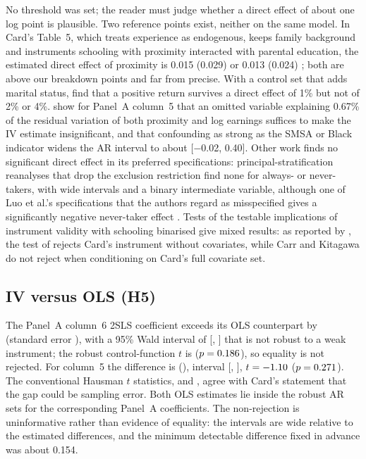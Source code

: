 \documentclass[11pt]{article}
\begin{document}
No threshold was set; the reader must judge whether a direct effect of about one log point
is plausible. Two reference points exist, neither on the same model. In Card's Table~5,
which treats experience as endogenous, keeps family background and instruments schooling
with proximity interacted with parental education, the estimated direct effect of
proximity is 0.015 (0.029) or 0.013 (0.024) \citep{card1993nber}; both are above our %
breakdown points and far from precise. With a control set that adds marital status,
\citet{steiner2025possibilistic} find that a positive return survives a direct effect of 1\%
but not of 2\% or 4\%. \citet{cinelli2025omitted} show for Panel~A column~5 that an omitted
variable explaining 0.67\% of the residual variation of both proximity and log earnings %
suffices to make the IV estimate insignificant, and that confounding as strong as the SMSA
or Black indicator widens the AR interval to about [$-$0.02, 0.40]. Other work finds no significant %
direct effect in its preferred specifications: principal-stratification reanalyses that
drop the exclusion restriction find none for always- or never-takers, with wide intervals
and a binary intermediate variable, although one of Luo et al.'s specifications that the
authors regard as misspecified gives a significantly negative never-taker effect
\citep{jiang2022multiply,luo2024identification}. Tests of the testable implications of
instrument validity with schooling binarised give mixed results: as reported by
\citet{carr2021testing}, the test of \citet{kitagawa2015test} rejects Card's instrument
without covariates, while Carr and Kitagawa do not reject when conditioning on Card's full
covariate set.

\subsection{IV versus OLS (H5)}
\label{sec:h5}

The Panel~A column~6 2SLS coefficient exceeds its OLS counterpart by \ASixPacoefDiff{}
(standard error \ASixPacoefDiffSe{}), with a 95\% Wald interval of [\ASixPacoefDiffLo,
\ASixPacoefDiffHi] that is not robust to a weak instrument; the robust control-function
$t$ is \ASixPacoefCfT{} ($p = 0.186$), so equality is not rejected. For column~5 the
difference is \AFivePacoefDiff{} (\AFivePacoefDiffSe{}), interval [\AFivePacoefDiffLo,
\AFivePacoefDiffHi], $t = -1.10$ ($p = 0.271$). The conventional Hausman
$t$ statistics, \ASixPacoefHausmanTConv{} and \AFivePacoefHausmanTConv{}, agree with Card's
statement that the gap could be sampling error. Both OLS estimates lie inside the robust AR
sets for the corresponding Panel~A coefficients. The non-rejection is uninformative rather
than evidence of equality: the intervals are wide relative to the estimated differences,
and the minimum detectable difference fixed in advance was about 0.154. %
\end{document}
